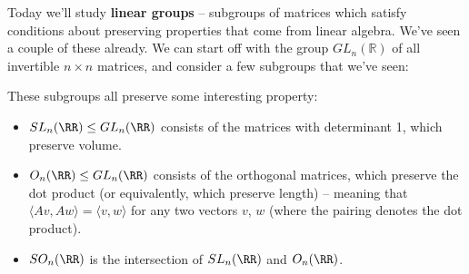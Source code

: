 Today we'll study \textbf{linear groups} -- subgroups of matrices which satisfy conditions about preserving properties that come from linear algebra. We've seen a couple of these already. We can start off with the group $GL_n(\mathbb{R})$ of all invertible $n \times n$ matrices, and consider a few subgroups that we've seen:
\begin{center}
\end{center}
These subgroups all preserve some interesting property:
\begin{itemize}
    \item $SL_n(\RR) \leq GL_n(\RR)$ consists of the matrices with determinant 1, which preserve volume.
    \item $O_n(\RR) \leq GL_n(\RR)$ consists of the orthogonal matrices, which preserve the dot product (or equivalently, which preserve length) -- meaning that $\langle Av, Aw\rangle = \langle v, w\rangle$ for any two vectors $v$, $w$ (where the pairing denotes the dot product). 
    \item $SO_n(\RR)$ is the intersection of $SL_n(\RR)$ and $O_n(\RR)$. 
\end{itemize}

